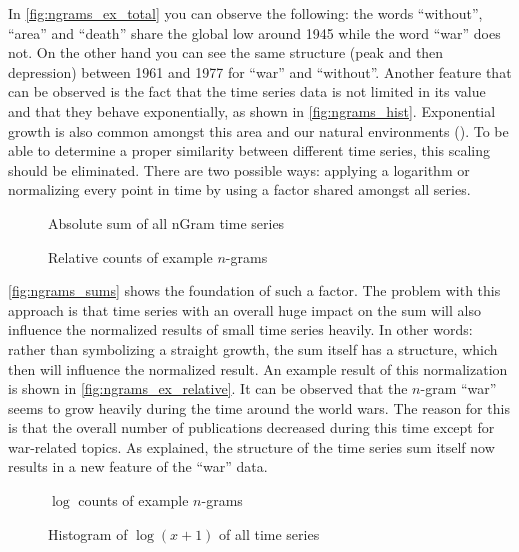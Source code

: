 In \autoref{fig:ngrams_ex_total} you can observe the following: the words \enquote{without}, \enquote{area} and \enquote{death} share the global low around 1945 while the word \enquote{war} does not. On the other hand you can see the same structure (peak and then depression) between 1961 and 1977 for \enquote{war} and \enquote{without}. Another feature that can be observed is the fact that the time series data is not limited in its value and that they behave exponentially, as shown in \autoref{fig:ngrams_hist}. Exponential growth is also common amongst this area and our natural environments (\cite{exp_growth1,exp_growth2}). To be able to determine a proper similarity between different time series, this scaling should be eliminated. There are two possible ways: applying a logarithm or normalizing every point in time by using a factor shared amongst all series.

\begin{figure}
    \centering
    
    \caption{Absolute sum of all nGram time series}\label{fig:ngrams_sums}
\end{figure}

\begin{figure}
    \centering
    
    \caption{Relative counts of example $n$-grams}\label{fig:ngrams_ex_relative}
\end{figure}

\autoref{fig:ngrams_sums} shows the foundation of such a factor. The problem with this approach is that time series with an overall huge impact on the sum will also influence the normalized results of small time series heavily. In other words: rather than symbolizing a straight growth, the sum itself has a structure, which then will influence the normalized result. An example result of this normalization is shown in \autoref{fig:ngrams_ex_relative}. It can be observed that the $n$-gram \enquote{war} seems to grow heavily during the time around the world wars. The reason for this is that the overall number of publications decreased during this time except for war-related topics. As explained, the structure of the time series sum itself now results in a new feature of the \enquote{war} data.

\begin{figure}
    \centering
    
    \caption{$\log$ counts of example $n$-grams}\label{fig:ngrams_ex_log}
\end{figure}

\begin{figure}
    \centering
    
    \caption{Histogram of $\log(x + 1)$ of all time series}\label{fig:ngrams_lhist}
\end{figure}

